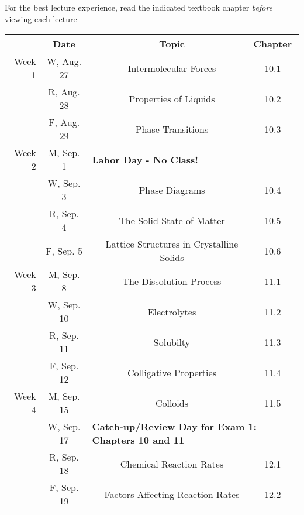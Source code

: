 \documentclass[12pt, letterpaper]{article}
\begin{document}
\noindent For the best lecture experience, read the indicated textbook chapter \emph{before} viewing each lecture

\begin{tabular}{rcccc}
& Date && Topic & Chapter\\
\midrule
Week 1 & W, Aug. 27&& Intermolecular Forces & 10.1\\
& R, Aug. 28&& Properties of Liquids & 10.2\\
& F, Aug. 29&& Phase Transitions & 10.3\\
\midrule
Week 2 & M, Sep. 1& \multicolumn{3}{l}{\textbf{Labor Day - No Class!}}\\
& W, Sep. 3&& Phase Diagrams & 10.4\\
& R, Sep. 4&& The Solid State of Matter & 10.5\\
& F, Sep. 5&& Lattice Structures in Crystalline Solids & 10.6\\
\midrule
Week 3 & M, Sep. 8&& The Dissolution Process & 11.1\\
& W, Sep. 10&& Electrolytes & 11.2\\
& R, Sep. 11&& Solubilty & 11.3\\
& F, Sep. 12&& Colligative Properties & 11.4\\
\midrule
Week 4 & M, Sep. 15&& Colloids & 11.5\\
& W, Sep. 17& \multicolumn{3}{l}{\textbf{Catch-up/Review Day for Exam 1: Chapters 10 and 11}}\\
& R, Sep. 18&& Chemical Reaction Rates & 12.1\\
& F, Sep. 19&& Factors Affecting Reaction Rates & 12.2\\
\end{tabular}
\end{document}

